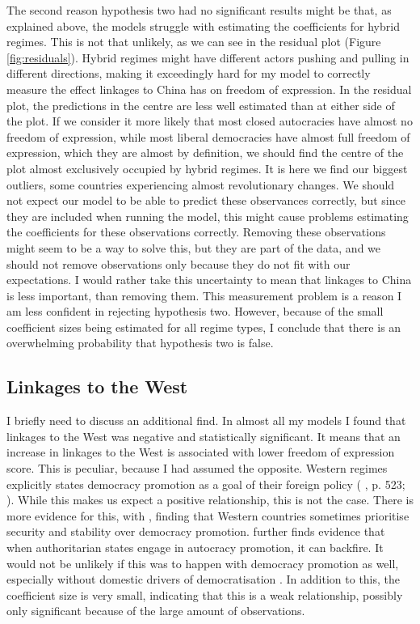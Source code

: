 The second reason hypothesis two had no significant results might be that, as explained above, the models struggle with estimating the coefficients for hybrid regimes. This is not that unlikely, as we can see in the residual plot (Figure \ref{fig:residuals}). Hybrid regimes might have different actors pushing and pulling in different directions, making it exceedingly hard for my model to correctly measure the effect linkages to China has on freedom of expression. In the residual plot, the predictions in the centre are less well estimated than at either side of the plot. If we consider it more likely that most closed autocracies have almost no freedom of expression, while most liberal democracies have almost full freedom of expression, which they are almost by definition, we should find the centre of the plot almost exclusively occupied by hybrid regimes. It is here we find our biggest outliers, some countries experiencing almost revolutionary changes. We should not expect our model to be able to predict these observances correctly, but since they are included when running the model, this might cause problems estimating the coefficients for these observations correctly. Removing these observations might seem to be a way to solve this, but they are part of the data, and we should not remove observations only because they do not fit with our expectations. I would rather take this uncertainty to mean that linkages to China is less important, than removing them. This measurement problem is a reason I am less confident in rejecting hypothesis two. However, because of the small coefficient sizes being estimated for all regime types, I conclude that there is an overwhelming probability that hypothesis two is false. 

\subsection{Linkages to the West}
I briefly need to discuss an additional find. In almost all my models I found that linkages to the West was negative and statistically significant. It means that an increase in linkages to the West is associated with lower freedom of expression score. This is peculiar, because I had assumed the opposite. Western regimes explicitly states democracy promotion as a goal of their foreign policy (\citeauthor{borzel_noble_2015} \citeyear{borzel_noble_2015}, p. 523; \citeauthor{levitsky_linkage_2006} \citeyear{levitsky_linkage_2006}). While this makes us expect a positive relationship, this is not the case. There is more evidence for this, with \citet[pp. 523-524]{borzel_noble_2015}, \citet[pp. 464-466]{delcour_spoiler_2015} \citet{freyburg_local_2015} finding that Western countries sometimes prioritise security and stability over democracy promotion. \citep{delcour_spoiler_2015} further finds evidence that when authoritarian states engage in autocracy promotion, it can backfire. It would not be unlikely if this was to happen with democracy promotion as well, especially without domestic drivers of democratisation \citep{risse_democracy_2015}. In addition to this, the coefficient size is very small, indicating that this is a weak relationship, possibly only significant because of the large amount of observations.

